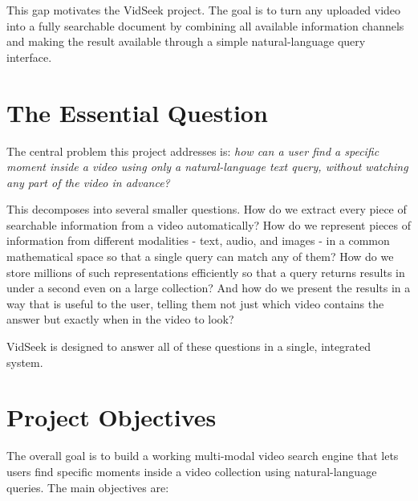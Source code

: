 \documentclass[12pt, a4paper]{report}
\begin{document}
This gap motivates the VidSeek project. The goal is to turn any uploaded
video into a fully searchable document by combining all available information
channels and making the result available through a simple natural-language
query interface.

\section{The Essential Question}

The central problem this project addresses is: \textit{how can a user find
a specific moment inside a video using only a natural-language text query,
without watching any part of the video in advance?}

This decomposes into several smaller questions. How do we extract every
piece of searchable information from a video automatically? How do we
represent pieces of information from different modalities - text, audio,
and images - in a common mathematical space so that a single query can
match any of them? How do we store millions of such representations
efficiently so that a query returns results in under a second even on a
large collection? And how do we present the results in a way that is useful
to the user, telling them not just which video contains the answer but
exactly when in the video to look?

VidSeek is designed to answer all of these questions in a single, integrated
system.

\section{Project Objectives}

The overall goal is to build a working multi-modal video search engine that
lets users find specific moments inside a video collection using natural-language
queries. The main objectives are:
\end{document}
